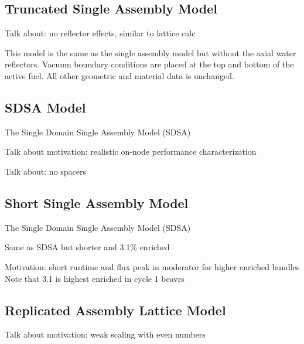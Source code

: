 \subsection{Truncated Single Assembly Model}
\label{sec:trunc-single-assembly}

Talk about: no reflector effects, similar to lattice calc

This model is the same as the single assembly model but without the axial water reflectors. Vacuum boundary conditions are placed at the top and bottom of the active fuel. All other geometric and material data is unchanged.

\subsection{SDSA Model}
\label{sec:sdsa}

The Single Domain Single Assembly Model (SDSA)

Talk about motivation: realistic on-node performance characterization

Talk about: no spacers

\subsection{Short Single Assembly Model}
\label{sec:short-single-assembly}

The Single Domain Single Assembly Model (SDSA)

Same as SDSA but shorter and 3.1\% enriched

Motivation: short runtime and flux peak in moderator for higher enriched bundles
Note that 3.1 is highest enriched in cycle 1 beavrs

\subsection{Replicated Assembly Lattice Model}
\label{sec:assembly-lattice}

Talk about motivation: weak scaling with even numbers